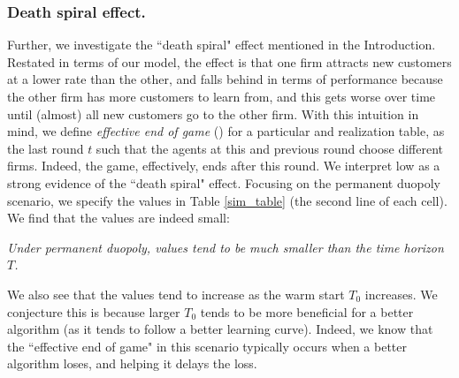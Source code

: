\documentclass[../competing_bandits_with_appendix.tex]{subfiles}
\begin{document}
\subsubsection{Death spiral effect.}
Further, we investigate the ``death spiral" effect mentioned in the Introduction. Restated in terms of our model, the effect is that one firm attracts new customers at a lower rate than the other, and falls behind in terms of performance because the other firm has more customers to learn from, and this gets worse over time until (almost) all new customers go to the other firm. With this intuition in mind, we define  \textit{effective end of game} (\Eeog) for a particular \MRV and realization table, as the last round $t$ such that the agents at this and previous round choose different firms. Indeed, the game, effectively, ends after this round. We interpret low \Eeog as a strong evidence of the ``death spiral" effect. Focusing on the permanent duopoly scenario, we specify the \Eeog values in Table \ref{sim_table} (the second line of each cell). We find that the \Eeog values are indeed small:

\begin{finding}
\textit{
Under permanent duopoly, \Eeog values tend to be much smaller than the time horizon $T$.
}
\end{finding}

We also see that the \Eeog values tend to increase as the warm start $T_0$ increases. We conjecture this is because larger $T_0$ tends to be more beneficial for a better algorithm (as it tends to follow a better learning curve). Indeed, we know that the ``effective end of game" in this scenario typically occurs when a better algorithm loses, and helping it delays the loss.
\end{document}
